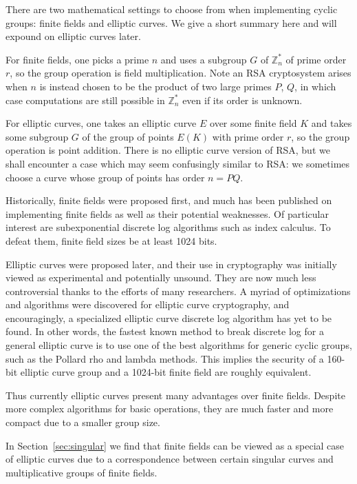 There are two mathematical settings to choose from
when implementing cyclic groups: finite fields and elliptic curves.
We give a short summary here and will expound on elliptic curves later.

For finite fields, one picks a prime $n$ and uses
a subgroup $G$ of $\mathbb{Z}_n^*$
of prime order $r$, so the group operation is field multiplication.
Note an RSA cryptosystem arises when $n$ is instead chosen to be the
product of two
large primes $P$, $Q$, in which case computations are still possible
in $\mathbb{Z}_n^*$ even if its order is unknown.

For elliptic curves, one takes an elliptic curve $E$ over some
finite field $K$ and takes some subgroup $G$ of the group of points
$E(K)$ with prime order $r$, so the group operation is point addition.
There is no elliptic curve version of RSA, but we shall encounter
a case which may seem confusingly similar to RSA: we sometimes choose
a curve whose group of points has order $n = PQ$.

Historically, finite fields were proposed first, and much has been published on
implementing finite fields as well as their potential weaknesses. Of particular
interest are subexponential discrete log algorithms such as index calculus.
To defeat them, finite field sizes be at least 1024 bits.

Elliptic curves were proposed later, and their use in cryptography was
initially viewed as experimental and potentially unsound. They are now much
less controversial thanks to the efforts of many researchers. A myriad of
optimizations and algorithms were discovered for elliptic curve cryptography,
and encouragingly, a specialized elliptic curve discrete log algorithm has yet
to be found. In other words, the fastest known method to break discrete log for
a general elliptic curve is to use one of the best algorithms for generic
cyclic groups, such as the Pollard rho and lambda methods. This implies the
security of a 160-bit elliptic curve group and a 1024-bit finite field are
roughly equivalent.

Thus currently elliptic curves present many advantages over finite fields.
Despite more complex algorithms for basic operations, they are much faster
and more compact due to a smaller group size.

In Section~\ref{sec:singular} we find that
finite fields can be viewed as a special case of elliptic
curves due to a correspondence between certain singular curves and
multiplicative groups of finite fields.

